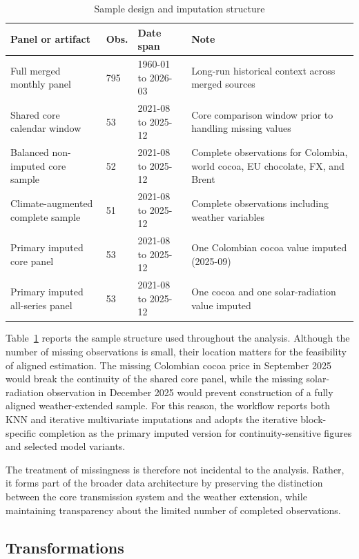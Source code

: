 \documentclass[11pt]{article}
\begin{document}
\begin{table}[H]
\centering
\caption{Sample design and imputation structure}
\label{tab:sample_design}
\small
\setlength{\tabcolsep}{4pt}
\begin{tabular}{p{5.0cm}p{1.8cm}p{3.2cm}p{3.8cm}}
\toprule
Panel or artifact & Obs. & Date span & Note \\
\midrule
Full merged monthly panel & 795 & 1960-01 to 2026-03 & Long-run historical context across merged sources \\
Shared core calendar window & 53 & 2021-08 to 2025-12 & Core comparison window prior to handling missing values \\
Balanced non-imputed core sample & 52 & 2021-08 to 2025-12 & Complete observations for Colombia, world cocoa, EU chocolate, FX, and Brent \\
Climate-augmented complete sample & 51 & 2021-08 to 2025-12 & Complete observations including weather variables \\
Primary imputed core panel & 53 & 2021-08 to 2025-12 & One Colombian cocoa value imputed (2025-09) \\
Primary imputed all-series panel & 53 & 2021-08 to 2025-12 & One cocoa and one solar-radiation value imputed \\
\bottomrule
\end{tabular}
\normalsize
\end{table}

Table~\ref{tab:sample_design} reports the sample structure used throughout the analysis. Although the number of missing observations is small, their location matters for the feasibility of aligned estimation. The missing Colombian cocoa price in September 2025 would break the continuity of the shared core panel, while the missing solar-radiation observation in December 2025 would prevent construction of a fully aligned weather-extended sample. For this reason, the workflow reports both KNN and iterative multivariate imputations and adopts the iterative block-specific completion as the primary imputed version for continuity-sensitive figures and selected model variants.

The treatment of missingness is therefore not incidental to the analysis. Rather, it forms part of the broader data architecture by preserving the distinction between the core transmission system and the weather extension, while maintaining transparency about the limited number of completed observations.

\subsection{Transformations}
\end{document}
